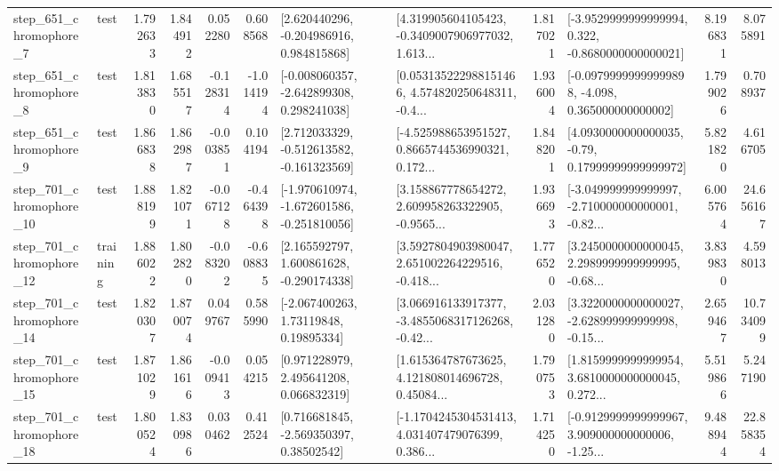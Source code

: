 \begin{tabular}{llrrrrllrlrr}
   step\_651\_chromophore\_7 &      test &      1.792633 &    1.844912 &      0.052280 &  0.608568 &    [2.620440296, -0.204986916, 0.984815868] &  [4.319905604105423, -0.3409007906977032, 1.613... &       1.817021 &  [-3.9529999999999994, 0.322, -0.8680000000000021] &            8.196831 &          8.075891 \\
   step\_651\_chromophore\_8 &      test &      1.813830 &    1.685517 &     -0.128314 & -1.014194 &   [-0.008060357, -2.642899308, 0.298241038] &  [0.053135222988151466, 4.574820250648311, -0.4... &       1.936004 &  [-0.09799999999999898, -4.098, 0.365000000000002] &            1.799026 &          0.708937 \\
   step\_651\_chromophore\_9 &      test &      1.866838 &    1.862987 &     -0.003851 &  0.104194 &   [2.712033329, -0.512613582, -0.161323569] &  [-4.525988653951527, 0.8665744536990321, 0.172... &       1.848201 &   [4.0930000000000035, -0.79, 0.17999999999999972] &            5.821820 &          4.616705 \\
  step\_701\_chromophore\_10 &      test &      1.888199 &    1.821071 &     -0.067128 & -0.464398 &  [-1.970610974, -1.672601586, -0.251810056] &  [3.158867778654272, 2.609958263322905, -0.9565... &       1.936693 &  [-3.049999999999997, -2.710000000000001, -0.82... &            6.005764 &         24.656167 \\
  step\_701\_chromophore\_12 &  training &      1.886022 &    1.802820 &     -0.083202 & -0.608835 &    [2.165592797, 1.600861628, -0.290174338] &  [3.5927804903980047, 2.651002264229516, -0.418... &       1.776520 &  [3.2450000000000045, 2.2989999999999995, -0.68... &            3.839830 &          4.598013 \\
  step\_701\_chromophore\_14 &      test &      1.820307 &    1.870074 &      0.049767 &  0.585990 &      [-2.067400263, 1.73119848, 0.19895334] &  [3.066916133917377, -3.4855068317126268, -0.42... &       2.031280 &  [3.3220000000000027, -2.628999999999998, -0.15... &            2.659467 &         10.734099 \\
  step\_701\_chromophore\_15 &      test &      1.871029 &    1.861616 &     -0.009413 &  0.054215 &     [0.971228979, 2.495641208, 0.066832319] &  [1.615364787673625, 4.121808014696728, 0.45084... &       1.790753 &  [1.8159999999999954, 3.6810000000000045, 0.272... &            5.519866 &          5.247190 \\
  step\_701\_chromophore\_18 &      test &      1.800524 &    1.830986 &      0.030462 &  0.412524 &     [0.716681845, -2.569350397, 0.38502542] &  [-1.1704245304531413, 4.031407479076399, 0.386... &       1.714250 &  [-0.9129999999999967, 3.909000000000006, -1.25... &            9.488944 &         22.858354 \\

\end{tabular}
